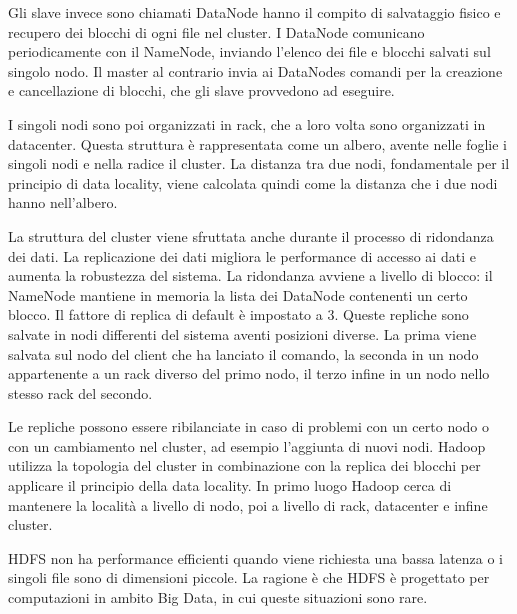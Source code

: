 Gli slave invece sono chiamati DataNode hanno il compito di salvataggio fisico e recupero dei blocchi di ogni file nel cluster.
I DataNode comunicano periodicamente con il NameNode, inviando l'elenco dei file e blocchi salvati sul singolo nodo.
Il master al contrario invia ai DataNodes comandi per la creazione e cancellazione di blocchi, che gli slave provvedono ad eseguire.

I singoli nodi sono poi organizzati in rack, che a loro volta sono organizzati in datacenter.
Questa struttura è rappresentata come un albero, avente nelle foglie i singoli nodi e nella radice il cluster.
La distanza tra due nodi, fondamentale per il principio di data locality, viene calcolata quindi come la distanza che i due nodi hanno nell'albero.

La struttura del cluster viene sfruttata anche durante il processo di ridondanza dei dati.
La replicazione dei dati migliora le performance di accesso ai dati e aumenta la robustezza del sistema.
La ridondanza avviene a livello di blocco: il NameNode mantiene in memoria la lista dei DataNode contenenti un certo blocco.
Il fattore di replica di default è impostato a 3.
Queste repliche sono salvate in nodi differenti del sistema aventi posizioni diverse.
La prima viene salvata sul nodo del client che ha lanciato il comando, la seconda in un nodo appartenente a un rack diverso del primo nodo, il terzo infine in un nodo nello stesso rack del secondo.

Le repliche possono essere ribilanciate in caso di problemi con un certo nodo o con un cambiamento nel cluster, ad esempio l'aggiunta di nuovi nodi.
Hadoop utilizza la topologia del cluster in combinazione con la replica dei blocchi per applicare il principio della data locality.
In primo luogo Hadoop cerca di mantenere la località a livello di nodo, poi a livello di rack, datacenter e infine cluster.

HDFS non ha performance efficienti quando viene richiesta una bassa latenza o i singoli file sono di dimensioni piccole.
La ragione è che HDFS è progettato per computazioni in ambito Big Data, in cui queste situazioni sono rare.